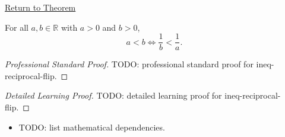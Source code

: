 \newpage
{}
\label{prf:ineq-reciprocal-flip}

\begin{remark*}[Return]
\hyperref[thm:ineq-reciprocal-flip]{Return to Theorem}
\end{remark*}

\begin{theorem*}
For all $a, b \in \mathbb{R}$ with $a > 0$ and $b > 0$,
\[
  a < b \iff \frac{1}{b} < \frac{1}{a}.
\]
\end{theorem*}

\begin{proof}[Professional Standard Proof]
\LRAProofBodyStart
TODO: professional standard proof for ineq-reciprocal-flip.
\end{proof}

\begin{proof}[Detailed Learning Proof]
\LRAProofBodyStart
TODO: detailed learning proof for ineq-reciprocal-flip.
\end{proof}

\begin{remark*}
\end{remark*}

\begin{dependencies}
\begin{itemize}
  \item TODO: list mathematical dependencies.
\end{itemize}
\end{dependencies}

\clearpage

